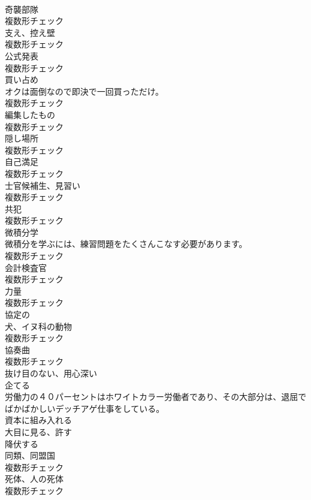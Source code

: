 \documentclass[8pt]{extreport}
\begin{document}
\begin{CJK}{UTF8}{min}
\\	[名詞]	奇襲部隊	
\\	複数形チェック
\\	[名詞]	支え、控え壁	
\\	複数形チェック
\\	[名詞]	公式発表	
\\	複数形チェック
\\	[名詞]	買い占め	
\\	オクは面倒なので即決で一回買っただけ。	
\\	複数形チェック
\\	[名詞]	編集したもの	
\\	複数形チェック
\\	[名詞]	隠し場所	
\\	複数形チェック
\\	[名詞]	自己満足	
\\	複数形チェック
\\	[名詞]	士官候補生、見習い	
\\	複数形チェック
\\	[名詞]	共犯	
\\	複数形チェック
\\	[名詞]	微積分学	
\\	微積分を学ぶには、練習問題をたくさんこなす必要があります。	
\\	複数形チェック
\\	[名詞]	会計検査官	
\\	複数形チェック
\\	[名詞]	力量	
\\	複数形チェック
\\	[形容詞]	協定の	
\\	[名詞]	犬、イヌ科の動物	
\\	複数形チェック
\\	[名詞]	協奏曲	
\\	複数形チェック
\\	[形容詞]	抜け目のない、用心深い	
\\	[動詞]	企てる	
\\	労働力の４０パーセントはホワイトカラー労働者であり、その大部分は、退屈でばかばかしいデッチアゲ仕事をしている。	
\\	[動詞]	資本に組み入れる	
\\	[動詞]	大目に見る、許す	
\\	[動詞]	降伏する	
\\	[名詞]	同類、同盟国	
\\	複数形チェック
\\	[名詞]	死体、人の死体	
\\	複数形チェック

\end{CJK}
\end{document}
